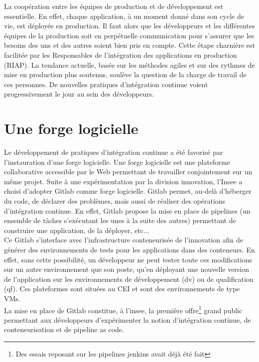 \documentclass[11pt,fleqn]{book} %
\begin{document}
 La coopération entre les équipes de production et de développement est essentielle. En effet, chaque application, à un moment donné dans son cycle de vie, est déployée en production. Il faut alors que les développeurs et les différentes équipes de la production soit en perpétuelle communication pour s'assurer que les besoins des uns et des autres soient bien pris en compte. Cette étape charnière est facilitée par les Responsables de l’intégration des applications en production (RIAP). La tendance actuelle, basée sur les méthodes agiles et sur des rythmes de mise en production plus soutenus,  soulève la question de la charge de travail de ces personnes. De nouvelles pratiques d'intégration continue voient progressivement le jour au sein des développeurs.\newline
\vspace{-0.5cm}
\section{Une forge logicielle}
Le développement de pratiques d'intégration continue a été favorisé par l'instauration d'une forge logicielle. Une forge logicielle est une plateforme collaborative accessible par le Web permettant de travailler conjointement sur un même projet. Suite à une expérimentation par la division innovation,  l'Insee a choisi d'adopter Gitlab comme forge logicielle. Gitlab permet, au-delà d'héberger du code, de déclarer des problèmes, mais aussi de réaliser des opérations d'intégration continue. En effet, Gitlab propose la mise en place de pipelines (un ensemble de tâches s'exécutant les unes à la suite des autres) permettant de construire une application, de la déployer, etc...\\

Ce Gitlab s'interface avec l'infrastructure conteneurisée de l'innovation afin de générer des environnements de tests pour les applications dans des conteneurs. En effet, sans cette possibilité, un développeur ne peut tester toute ces modifications sur un autre environnement que son poste, qu'en déployant une nouvelle version de l'application sur les environnements de développement (dv) ou de qualification (qf). Ces plateformes sont situées au CEI et sont des environnements de type VMs.\\

La mise en place de Gitlab constitue, à l'insee, la première offre\footnote{Des essais reposant sur les pipelines jenkins avait déjà été fait} grand public permettant aux développeurs d'expérimenter la notion d'intégration continue, de conteneurisation et de pipeline as code.\newline
\end{document}
